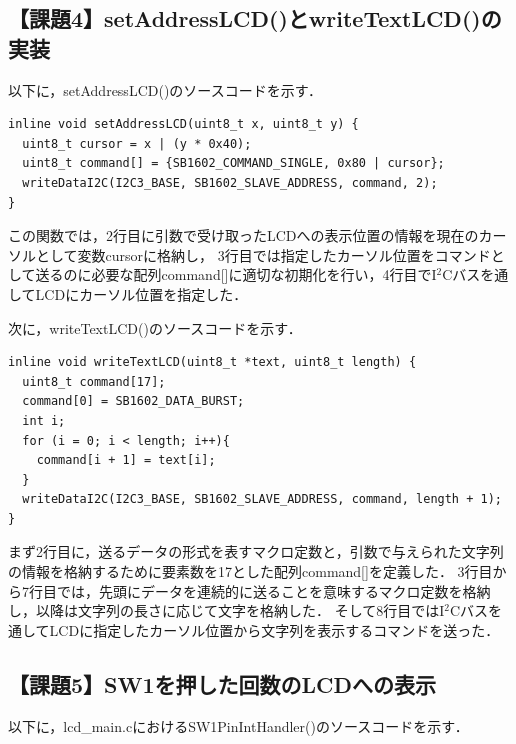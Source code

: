 \documentclass{jlreq}
\begin{document}
\subsection{【課題4】setAddressLCD()とwriteTextLCD()の実装}
以下に，setAddressLCD()のソースコードを示す．

\begin{lstlisting}[label=a4setAddress,caption={【課題4】におけるsetAddressLCD関数}]
inline void setAddressLCD(uint8_t x, uint8_t y) {
  uint8_t cursor = x | (y * 0x40);
  uint8_t command[] = {SB1602_COMMAND_SINGLE, 0x80 | cursor};
  writeDataI2C(I2C3_BASE, SB1602_SLAVE_ADDRESS, command, 2);
}
\end{lstlisting}

この関数では，2行目に引数で受け取ったLCDへの表示位置の情報を現在のカーソルとして変数cursorに格納し，
3行目では指定したカーソル位置をコマンドとして送るのに必要な配列command[]に適切な初期化を行い，4行目でI$^2$Cバスを通してLCDにカーソル位置を指定した．

次に，writeTextLCD()のソースコードを示す．

\begin{lstlisting}[label=a4writeText,caption={【課題4】におけるwriteTextLCD関数}]
inline void writeTextLCD(uint8_t *text, uint8_t length) {
  uint8_t command[17];
  command[0] = SB1602_DATA_BURST;
  int i;
  for (i = 0; i < length; i++){
    command[i + 1] = text[i];
  }
  writeDataI2C(I2C3_BASE, SB1602_SLAVE_ADDRESS, command, length + 1);
}
\end{lstlisting}

まず2行目に，送るデータの形式を表すマクロ定数と，引数で与えられた文字列の情報を格納するために要素数を17とした配列command[]を定義した．
3行目から7行目では，先頭にデータを連続的に送ることを意味するマクロ定数を格納し，以降は文字列の長さに応じて文字を格納した．
そして8行目ではI$^2$Cバスを通してLCDに指定したカーソル位置から文字列を表示するコマンドを送った．

\subsection{【課題5】SW1を押した回数のLCDへの表示}
以下に，lcd\_main.cにおけるSW1PinIntHandler()のソースコードを示す．
\end{document}
